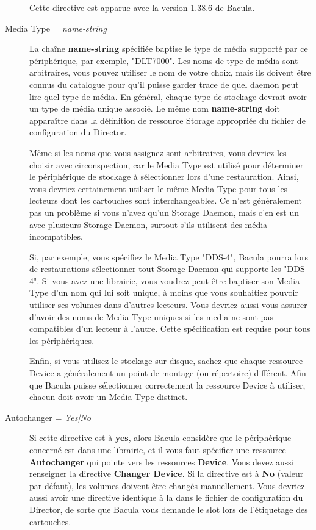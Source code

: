 \begin{description}
  Cette directive est apparue avec la version 1.38.6 de Bacula.
  
\item [Media Type = {\it name-string}]
   La cha\^ine {\bf name-string} sp\'ecifi\'ee baptise le type de m\'edia support\'e par 
   ce p\'eriph\'erique, par exemple, "DLT7000". Les noms de type de m\'edia sont 
   arbitraires, vous pouvez utiliser le nom de votre choix, mais ils doivent 
   \^etre connus du catalogue pour qu'il puisse garder trace de quel daemon 
   peut lire quel type de m\'edia. En g\'en\'eral, chaque type de stockage devrait 
   avoir un type de m\'edia unique associ\'e. Le m\^eme nom {\bf name-string} doit 
   appara\^itre dans la d\'efinition de ressource Storage appropri\'ee du fichier 
   de configuration du Director.
   
   M\^eme si les noms que vous assignez sont arbitraires, vous devriez les choisir 
   avec circonspection, car le Media Type est utilis\'e pour d\'eterminer le 
   p\'eriph\'erique de stockage \`a s\'electionner lors d'une restauration. Ainsi, vous 
   devriez certainement utiliser le m\^eme Media Type pour tous les lecteurs 
   dont les cartouches sont interchangeables. Ce n'est g\'en\'eralement pas un 
   probl\`eme si vous n'avez qu'un Storage Daemon, mais c'en est un avec plusieurs 
   Storage Daemon, surtout s'ils utilisent des m\'edia incompatibles.
  
   Si, par exemple, vous sp\'ecifiez le Media Type "DDS-4", Bacula pourra lors de 
   restaurations s\'electionner tout Storage Daemon qui supporte les "DDS-4". 
   Si vous avez une librairie, vous voudrez peut-\^etre baptiser son Media Type 
   d'un nom qui lui soit unique, \`a moins que vous souhaitiez pouvoir utiliser 
   ses volumes dans d'autres lecteurs. Vous devriez aussi vous assurer d'avoir 
   des noms de Media Type uniques si les media ne sont pas compatibles d'un 
   lecteur \`a l'autre. Cette sp\'ecification est requise pour tous les 
   p\'eriph\'eriques.

   Enfin, si vous utilisez le stockage sur disque, sachez que chaque ressource 
   Device a g\'en\'eralement un point de montage (ou r\'epertoire) diff\'erent. Afin 
   que Bacula puisse s\'electionner correctement la ressource Device \`a utiliser, 
   chacun doit avoir un Media Type distinct.
   
\label{Autochanger}
\item [Autochanger = {\it Yes|No}]
   Si cette directive est \`a {\bf yes}, alors Bacula consid\`ere que le p\'eriph\'erique 
   concern\'e est dans une librairie, et il vous faut sp\'ecifier une ressource 
   {\bf Autochanger} qui pointe vers les ressources {\bf Device}. Vous devez 
   aussi renseigner la directive {\bf Changer Device}. Si la directive est \`a {\bf No} 
   (valeur par d\'efaut), les volumes doivent \^etre chang\'es manuellement. Vous devriez 
   aussi avoir une directive identique \`a la  dans 
   le fichier de configuration du Director, de sorte que Bacula vous demande le slot
   lors de l'\'etiquetage des cartouches.
   

\end{description}
